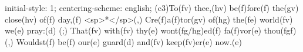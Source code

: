 initial-style: 1;
centering-scheme: english;
(c3)To(fv) thee,(hv) be(f)fore(f) the(gv) close(hv) of(f) day,(f) <sp>*</sp>(,)
Cre(f)a(f)tor(gv) of(hg) the(fe) world(fv) we(e) pray:(d) (;)
That(fv) with(fv) thy(e) wont(fg/hg)ed(f) fa(f)vor(e) thou(fgf) (,)
Wouldst(f) be(f) our(e) guard(d) and(fv) keep(fv)er(e) now.(e)
